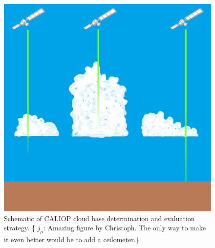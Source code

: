 \documentclass[amt,manuscript]{copernicus}\usepackage[]{graphicx}\usepackage[]{color}
\newcommand{\hlnum}[1]{\textcolor[rgb]{0.686,0.059,0.569}{#1}}%
\newcommand\comment[2]{\{\hlnum{ \textit{#1}: #2}\}}
\newcommand\commentjm[1]{\comment{$j_\mu$}{#1}}
\begin{document}

\begin{figure}
  \centering
  \includegraphics[width=0.5\linewidth,keepaspectratio=true]{CloudFieldCALIOP.pdf}
  \caption{Schematic of CALIOP cloud base determination and evaluation strategy.
    \commentjm{Amazing figure by Christoph.  The only way to make it even better
      would be to add a ceilometer.}}
  \label{fig:method}
\end{figure}
\end{document}

